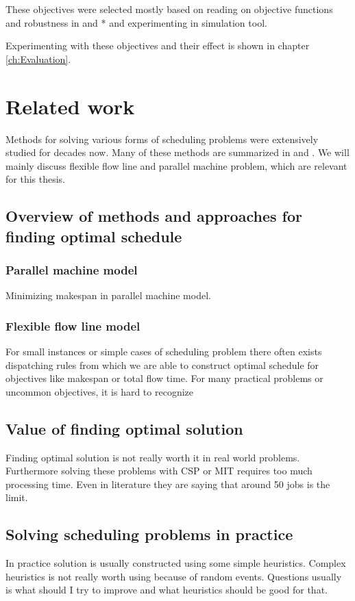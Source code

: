 \documentclass{ctuthesis}
\begin{document}
 These objectives were selected mostly based on reading on objective functions and robustness in \cite{pinedo} and \cite{tkindt}* and experimenting in simulation tool. 
 
 Experimenting with these objectives and their effect is shown in chapter \ref{ch:Evaluation}.

\chapter{Related work}

Methods for solving various forms of scheduling problems were extensively studied for decades now. Many of these methods are summarized in \cite{pinedo} and \cite{bucker}. We will mainly discuss flexible flow line and parallel machine problem, which are relevant for this thesis. 

\section{Overview of methods and approaches for finding optimal schedule}
\subsection{Parallel machine model}

Minimizing makespan in parallel machine model. 
\subsection{Flexible flow line model}

For small instances or simple cases of scheduling problem there often exists dispatching rules from which we are able to construct optimal schedule for objectives like makespan or total flow time. For many practical problems or uncommon objectives, it is hard to recognize 

\section{Value of finding optimal solution}
Finding optimal solution is not really worth it in real world problems. Furthermore solving these problems with CSP or MIT requires too much processing time. Even in literature they are saying that around 50 jobs is the limit. 
\section{Solving scheduling problems in practice}
In practice solution is usually constructed using some simple heuristics. Complex heuristics is not really worth using because of random events. Questions usually is what should I try to improve and what heuristics should be good for that. 
\end{document}
